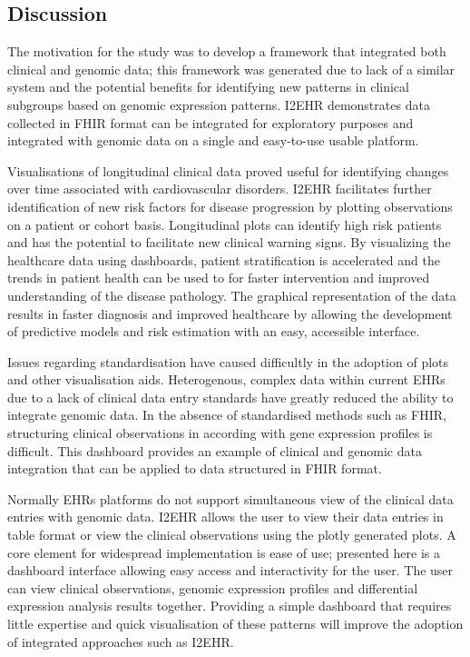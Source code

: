 \documentclass{bioinfo}
\begin{document}
\begin{Discussion}

\section{Discussion}
\enlargethispage{6pt}
The motivation for the study was to develop a framework that integrated both clinical and genomic data; this framework was generated due to lack of a similar system and the potential benefits for identifying new patterns in clinical subgroups based on genomic expression patterns. I2EHR demonstrates data collected in FHIR format can be integrated for exploratory purposes and integrated with genomic data on a single and easy-to-use usable platform.

Visualisations of longitudinal clinical data proved useful for identifying changes over time associated with cardiovascular disorders. I2EHR facilitates further identification of new risk factors for disease progression by plotting observations on a patient or cohort basis. Longitudinal plots can identify high risk patients and has the potential to facilitate new clinical warning signs. By visualizing the healthcare data using dashboards, patient stratification is accelerated and the trends in patient health can be used to for faster intervention and improved understanding of the disease pathology. The graphical representation of the data results in faster diagnosis and improved healthcare by allowing the development of predictive models and risk estimation with an easy, accessible interface.  


Issues regarding standardisation have caused difficultly in the adoption of plots and other visualisation aids. Heterogenous, complex data 
within current EHRs due to a lack of clinical data entry standards have greatly reduced the ability to integrate genomic data. In the absence of standardised methods such as FHIR, structuring clinical observations in according with gene expression profiles is difficult. This dashboard provides an example of clinical and genomic data integration that can be applied to data structured in FHIR format.


Normally EHRs platforms do not support simultaneous view of the clinical data entries with genomic data. I2EHR allows the user to view their data entries in table format or view the  clinical observations using the plotly generated plots. A core element for widespread implementation is ease of use; presented here is a dashboard interface allowing easy access and interactivity for the user. The user can view clinical observations, genomic expression profiles and differential expression analysis results together. Providing a simple dashboard that requires little expertise and quick visualisation of these patterns will improve the adoption of integrated approaches such as I2EHR.



\end{Discussion}
\end{document}

